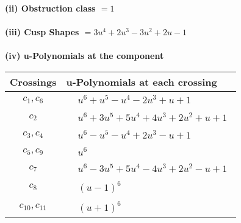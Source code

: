 \documentclass[1p]{elsarticle_modified}
\theoremstyle{definition}
\begin{document}
\flushleft \textbf{(ii) Obstruction class $= 1$}\\~\\
\flushleft \textbf{(iii) Cusp Shapes $= 3 u^4+2 u^3-3 u^2+2 u-1$}\\~\\
\newpage\renewcommand{\arraystretch}{1}
\flushleft \textbf{(iv) u-Polynomials at the component}\newline \\
\begin{tabular}{m{50pt}|m{274pt}}
Crossings & \hspace{64pt}u-Polynomials at each crossing \\
\hline $$\begin{aligned}c_{1},c_{6}\end{aligned}$$&$\begin{aligned}
&u^6+u^5- u^4-2 u^3+u+1
\end{aligned}$\\
\hline $$\begin{aligned}c_{2}\end{aligned}$$&$\begin{aligned}
&u^6+3 u^5+5 u^4+4 u^3+2 u^2+u+1
\end{aligned}$\\
\hline $$\begin{aligned}c_{3},c_{4}\end{aligned}$$&$\begin{aligned}
&u^6- u^5- u^4+2 u^3- u+1
\end{aligned}$\\
\hline $$\begin{aligned}c_{5},c_{9}\end{aligned}$$&$\begin{aligned}
&u^6
\end{aligned}$\\
\hline $$\begin{aligned}c_{7}\end{aligned}$$&$\begin{aligned}
&u^6-3 u^5+5 u^4-4 u^3+2 u^2- u+1
\end{aligned}$\\
\hline $$\begin{aligned}c_{8}\end{aligned}$$&$\begin{aligned}
&(u-1)^6
\end{aligned}$\\
\hline $$\begin{aligned}c_{10},c_{11}\end{aligned}$$&$\begin{aligned}
&(u+1)^6
\end{aligned}$\\
\hline
\end{tabular}\\~\\
\end{document}
